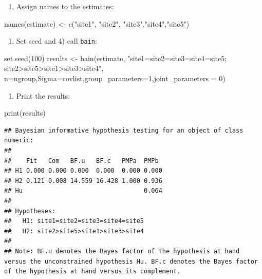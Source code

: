 \documentclass[
]{book}
\newenvironment{Shaded}{\begin{snugshade}}{\end{snugshade}}
\newcommand{\AttributeTok}[1]{\textcolor[rgb]{0.77,0.63,0.00}{#1}}
\newcommand{\DecValTok}[1]{\textcolor[rgb]{0.00,0.00,0.81}{#1}}
\newcommand{\FunctionTok}[1]{\textcolor[rgb]{0.00,0.00,0.00}{#1}}
\newcommand{\NormalTok}[1]{#1}
\newcommand{\OtherTok}[1]{\textcolor[rgb]{0.56,0.35,0.01}{#1}}
\newcommand{\StringTok}[1]{\textcolor[rgb]{0.31,0.60,0.02}{#1}}
\providecommand{\tightlist}{%
  \setlength{\itemsep}{0pt}\setlength{\parskip}{0pt}}
\begin{document}
\begin{enumerate}
\def\labelenumi{\arabic{enumi})}
\setcounter{enumi}{1}
\tightlist
\item
  Assign names to the estimates:
\end{enumerate}

\begin{Shaded}
\begin{Highlighting}[]
\FunctionTok{names}\NormalTok{(estimate) }\OtherTok{\textless{}{-}} \FunctionTok{c}\NormalTok{(}\StringTok{"site1"}\NormalTok{, }\StringTok{"site2"}\NormalTok{, }\StringTok{"site3"}\NormalTok{,}\StringTok{"site4"}\NormalTok{,}\StringTok{"site5"}\NormalTok{)}
\end{Highlighting}
\end{Shaded}

\begin{enumerate}
\def\labelenumi{\arabic{enumi})}
\setcounter{enumi}{2}
\tightlist
\item
  Set seed and 4) call \texttt{bain}:
\end{enumerate}

\begin{Shaded}
\begin{Highlighting}[]
\FunctionTok{set.seed}\NormalTok{(}\DecValTok{100}\NormalTok{)}
\NormalTok{results }\OtherTok{\textless{}{-}} \FunctionTok{bain}\NormalTok{(estimate,}
\StringTok{"site1=site2=site3=site4=site5; site2\textgreater{}site5\textgreater{}site1\textgreater{}site3\textgreater{}site4"}\NormalTok{,}
\AttributeTok{n=}\NormalTok{ngroup,}\AttributeTok{Sigma=}\NormalTok{covlist,}\AttributeTok{group\_parameters=}\DecValTok{1}\NormalTok{,}\AttributeTok{joint\_parameters =} \DecValTok{0}\NormalTok{)}
\end{Highlighting}
\end{Shaded}

\begin{enumerate}
\def\labelenumi{\arabic{enumi})}
\setcounter{enumi}{4}
\tightlist
\item
  Print the results:
\end{enumerate}

\begin{Shaded}
\begin{Highlighting}[]
\FunctionTok{print}\NormalTok{(results)}
\end{Highlighting}
\end{Shaded}

\begin{verbatim}
## Bayesian informative hypothesis testing for an object of class numeric:
## 
##    Fit   Com   BF.u   BF.c   PMPa  PMPb 
## H1 0.000 0.000 0.000  0.000  0.000 0.000
## H2 0.121 0.008 14.559 16.428 1.000 0.936
## Hu                                 0.064
## 
## Hypotheses:
##   H1: site1=site2=site3=site4=site5
##   H2: site2>site5>site1>site3>site4
## 
## Note: BF.u denotes the Bayes factor of the hypothesis at hand versus the unconstrained hypothesis Hu. BF.c denotes the Bayes factor of the hypothesis at hand versus its complement.
\end{verbatim}
\end{document}
